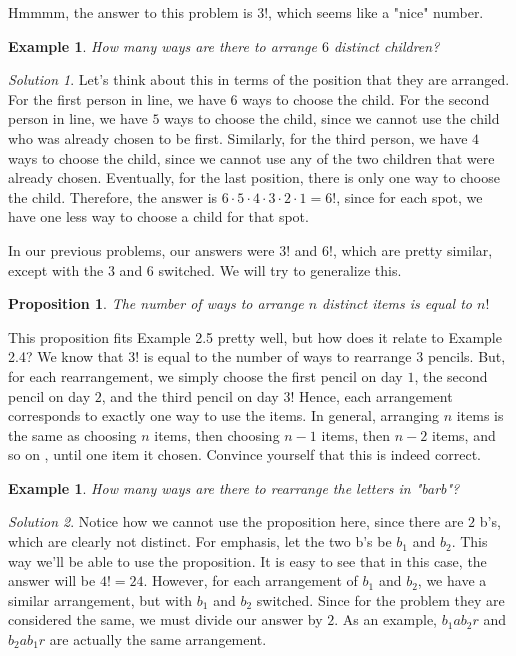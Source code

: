 \documentclass[letterpaper]{article}
\newtheorem{prop}[thm]{Proposition}
\newtheorem{example}[thm]{Example}
\theoremstyle{remark}
\newtheorem*{solution}{Solution}
\theoremstyle{definition}
\begin{document}
Hmmmm, the answer to this problem is $3!$, which seems like a "nice" number. 

\begin{example}

How many ways are there to arrange $6$ distinct children?
\end{example}

\begin{solution}

Let's think about this in terms of the position that they are arranged. For the first person in line, we have $6$ ways to choose the child. For the second person in line, we have $5$ ways to choose the child, since we cannot use the child who was already chosen to be first. Similarly, for the third person, we have $4$ ways to choose the child, since we cannot use any of the two children that were already chosen. Eventually, for the last position, there is only one way to choose the child. Therefore, the answer is $6\cdot 5\cdot 4\cdot 3\cdot 2\cdot 1=6!$, since for each spot, we have one less way to choose a child for that spot.
\end{solution}



In our previous problems, our answers were $3!$ and $6!$, which are pretty similar, except with the $3$ and $6$ switched. We will try to generalize this.

\begin{prop}
The number of ways to arrange $n$ distinct items is equal to $n!$
\end{prop}

This proposition fits Example 2.5 pretty well, but how does it relate to Example 2.4? We know that $3!$ is equal to the number of ways to rearrange $3$ pencils. But, for each rearrangement, we simply choose the first pencil on day $1$, the second pencil on day $2$, and the third pencil on day $3$! Hence, each arrangement corresponds to exactly one way to use the items. In general, arranging $n$ items is the same as choosing $n$ items, then choosing $n-1$ items, then $n-2$ items, and so on , until one item it chosen. Convince yourself that this is indeed correct. 
\newline

\begin{example}
How many ways are there to rearrange the letters in "barb"?
\end{example}

\begin{solution}
Notice how we cannot use the proposition here, since there are $2$ b's, which are clearly not distinct. For emphasis, let the two b's be $b_1$ and $b_2$. This way we'll be able to use the proposition. It is easy to see that in this case, the answer will be $4!=24$. However, for each arrangement of $b_1$ and $b_2$, we have a similar arrangement, but with $b_1$ and $b_2$ switched. Since for the problem they are considered the same, we must divide our answer by $2$. As an example, $b_1 a b_2 r$ and $b_2 a b_1 r$ are actually the same arrangement.
\end{solution}
\end{document}
